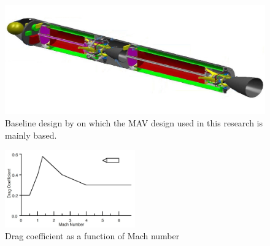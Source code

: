 \begin{table}[H]
\begin{center}
\begin{tabularx}{1.0\textwidth}{|X|X|X|c|}
\end{tabularx}
\end{center}
\end{table} 











\begin{figure}[H]
\centering
\includegraphics[width=0.5 \textwidth]{figures/launcher_methods/baseline_liquid2_trinidad2012.jpg}
\caption{Baseline design by \cite{trinidad2012} on which the \ac{MAV} design used in this research is mainly based.}
\label{fig:baseline_liquid2_trinidad2012}
\end{figure}



\begin{figure}[H]
\centering
\includegraphics[width=0.5\textwidth]{figures/launcher_methods/dragcoeff_whitehead2004mars.jpg}
\caption{Drag coefficient as a function of Mach number \citep{whitehead2004mars}}
\label{fig:dragcoeff_whitehead2004mars}
\end{figure}




